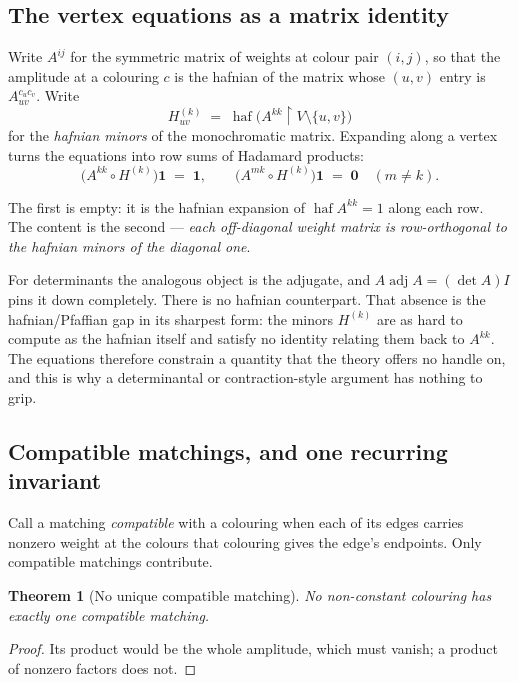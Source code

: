 \documentclass[11pt]{article}
\newtheorem{theorem}{Theorem}[section]
\theoremstyle{definition}
\theoremstyle{remark}
\begin{document}
\subsection{The vertex equations as a matrix identity}

Write $A^{ij}$ for the symmetric matrix of weights at colour pair $(i,j)$, so that
the amplitude at a colouring $c$ is the hafnian of the matrix whose $(u,v)$ entry is
$A^{c_uc_v}_{uv}$. Write
\[
  H^{(k)}_{uv} \;=\; \operatorname{haf}\bigl(A^{kk}\restriction V\setminus\{u,v\}\bigr)
\]
for the \emph{hafnian minors} of the monochromatic matrix. Expanding along a vertex
turns the equations into row sums of Hadamard products:
\[
  \bigl(A^{kk}\circ H^{(k)}\bigr)\mathbf{1} \;=\; \mathbf{1},
  \qquad
  \bigl(A^{mk}\circ H^{(k)}\bigr)\mathbf{1} \;=\; \mathbf{0}
  \quad (m\neq k).
\]

The first is empty: it is the hafnian expansion of $\operatorname{haf}A^{kk}=1$ along
each row. The content is the second --- \emph{each off-diagonal weight matrix is
row-orthogonal to the hafnian minors of the diagonal one}.

For determinants the analogous object is the adjugate, and $A\operatorname{adj}A =
(\det A)I$ pins it down completely. There is no hafnian counterpart. That absence is
the hafnian/Pfaffian gap in its sharpest form: the minors $H^{(k)}$ are as hard to
compute as the hafnian itself and satisfy no identity relating them back to
$A^{kk}$. The equations therefore constrain a quantity that the theory offers no
handle on, and this is why a determinantal or contraction-style argument has nothing
to grip.

\subsection{Compatible matchings, and one recurring invariant}

Call a matching \emph{compatible} with a colouring when each of its edges carries
nonzero weight at the colours that colouring gives the edge's endpoints. Only
compatible matchings contribute.

\begin{theorem}[No unique compatible matching]\label{thm:uniq}
No non-constant colouring has exactly one compatible matching.
\end{theorem}

\begin{proof}
Its product would be the whole amplitude, which must vanish; a product of nonzero
factors does not.
\end{proof}
\end{document}
